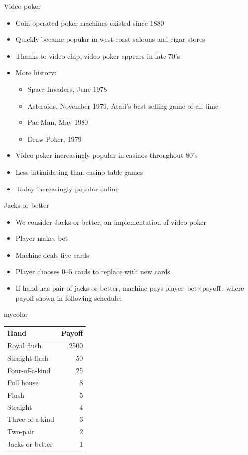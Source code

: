 \documentclass[handout,xcolor=dvipsnames]{beamer}
\theoremstyle{definition}
\begin{document}
\begin{frame}{Video poker}
\begin{itemize}
\item Coin operated poker machines existed since 1880
\item Quickly became popular in west-coast
saloons and cigar stores
\item Thanks to video chip, video poker appears in late 70's
\item More history:
\begin{itemize}
\item \alert{Space Invaders}, June 1978
\item \alert{Asteroids}, November 1979, Atari's best-selling game of all time
\item \alert{Pac-Man}, May 1980
\item \alert{Draw Poker}, 1979
\end{itemize}
\item Video poker increasingly popular in casinos throughout 80's
\item Less intimidating than casino table games
\item Today increasingly popular online
\end{itemize}
\end{frame}

\begin{frame}{Jacks-or-better}
\begin{multicols}{2}
\begin{itemize}
\item We consider \alert{Jacks-or-better},
an implementation of video poker
\item Player makes bet
\item Machine deals five cards
\item Player chooses $0$--$5$ cards to replace with new cards
\item If hand has pair of jacks or better, machine pays
player $\text{bet}\times\text{payoff}$, where payoff shown in
following schedule:
\end{itemize}
\begin{beamercolorbox}{mycolor}
\begin{tabular}{lr}
Hand&Payoff\\\hline
Royal flush&2500\\
Straight flush&50\\
Four-of-a-kind&25\\
Full house&8\\
Flush&5\\
Straight&4\\
Three-of-a-kind&3\\
Two-pair&2\\
Jacks or better&1
\end{tabular}
\end{beamercolorbox}
\end{multicols}
\end{frame}
\end{document}
